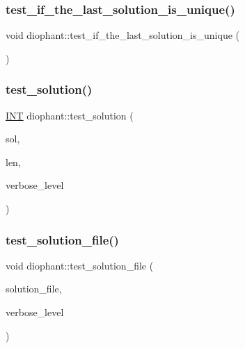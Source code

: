 \mbox{\label{classdiophant_a78f213245d5ee46f6e3fdd52f149cb48}} 
\subsubsection{\texorpdfstring{test\+\_\+if\+\_\+the\+\_\+last\+\_\+solution\+\_\+is\+\_\+unique()}{test\_if\_the\_last\_solution\_is\_unique()}}
{\footnotesize\ttfamily void diophant\+::test\+\_\+if\+\_\+the\+\_\+last\+\_\+solution\+\_\+is\+\_\+unique (\begin{DoxyParamCaption}{ }\end{DoxyParamCaption})}

\mbox{\label{classdiophant_a385461230652130d1e4587cd99211462}} 
\subsubsection{\texorpdfstring{test\+\_\+solution()}{test\_solution()}}
{\footnotesize\ttfamily \mbox{\hyperlink{galois_8h_a09fddde158a3a20bd2dcadb609de11dc}{I\+NT}} diophant\+::test\+\_\+solution (\begin{DoxyParamCaption}\item[{\mbox{\hyperlink{galois_8h_a09fddde158a3a20bd2dcadb609de11dc}{I\+NT}} $\ast$}]{sol,  }\item[{\mbox{\hyperlink{galois_8h_a09fddde158a3a20bd2dcadb609de11dc}{I\+NT}}}]{len,  }\item[{\mbox{\hyperlink{galois_8h_a09fddde158a3a20bd2dcadb609de11dc}{I\+NT}}}]{verbose\+\_\+level }\end{DoxyParamCaption})}

\mbox{\label{classdiophant_ad5b890dbe56e93b6e7f2759d7d8ba35f}} 
\subsubsection{\texorpdfstring{test\+\_\+solution\+\_\+file()}{test\_solution\_file()}}
{\footnotesize\ttfamily void diophant\+::test\+\_\+solution\+\_\+file (\begin{DoxyParamCaption}\item[{const \mbox{\hyperlink{galois_8h_ab6cc7b4aeb6ea31aba2b3fbfc83ff5e6}{B\+Y\+TE}} $\ast$}]{solution\+\_\+file,  }\item[{\mbox{\hyperlink{galois_8h_a09fddde158a3a20bd2dcadb609de11dc}{I\+NT}}}]{verbose\+\_\+level }\end{DoxyParamCaption})}

